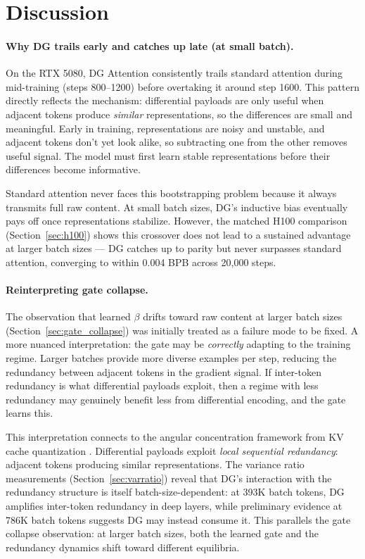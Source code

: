 \documentclass[11pt]{article}
\begin{document}
\section{Discussion}
\label{sec:discussion}

\paragraph{Why DG trails early and catches up late (at small batch).}
On the RTX 5080, DG Attention consistently trails standard attention during mid-training (steps 800--1200) before overtaking it around step 1600. This pattern directly reflects the mechanism: differential payloads are only useful when adjacent tokens produce \emph{similar} representations, so the differences are small and meaningful. Early in training, representations are noisy and unstable, and adjacent tokens don't yet look alike, so subtracting one from the other removes useful signal. The model must first learn stable representations before their differences become informative.

Standard attention never faces this bootstrapping problem because it always transmits full raw content. At small batch sizes, DG's inductive bias eventually pays off once representations stabilize. However, the matched H100 comparison (Section~\ref{sec:h100}) shows this crossover does not lead to a sustained advantage at larger batch sizes --- DG catches up to parity but never surpasses standard attention, converging to within 0.004 BPB across 20{,}000 steps.

\paragraph{Reinterpreting gate collapse.}
The observation that learned $\beta$ drifts toward raw content at larger batch sizes (Section~\ref{sec:gate_collapse}) was initially treated as a failure mode to be fixed. A more nuanced interpretation: the gate may be \emph{correctly} adapting to the training regime. Larger batches provide more diverse examples per step, reducing the redundancy between adjacent tokens in the gradient signal. If inter-token redundancy is what differential payloads exploit, then a regime with less redundancy may genuinely benefit less from differential encoding, and the gate learns this.

This interpretation connects to the angular concentration framework from KV cache quantization \citep{han2025polarquant,zandieh2025turboquant}. Differential payloads exploit \emph{local sequential redundancy}: adjacent tokens producing similar representations. The variance ratio measurements (Section~\ref{sec:varratio}) reveal that DG's interaction with the redundancy structure is itself batch-size-dependent: at 393K batch tokens, DG amplifies inter-token redundancy in deep layers, while preliminary evidence at 786K batch tokens suggests DG may instead consume it. This parallels the gate collapse observation: at larger batch sizes, both the learned gate and the redundancy dynamics shift toward different equilibria.
\end{document}
